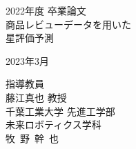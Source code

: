 \documentclass{jsarticle}
\begin{document}
  \begin{titlepage}
    \begin{center}
      \vspace*{1cm}
      \LARGE 2022年度 卒業論文 \\
      \vspace*{1cm}
      \Huge 商品レビューデータを用いた \\
      星評価予測 \\
      \vspace*{45mm}

      {\LARGE %
      2023年3月}
      \vspace*{10mm}
      
      {\Large
      指導教員 \\
      藤江真也 教授} \\
      \vspace*{20mm}
      \LARGE
      千葉工業大学 先進工学部 \\
      未来ロボティクス学科 \\
      \vspace*{10mm}
      {\Huge 牧~野~幹~也}
    \end{center}
  \end{titlepage}

  \frontmatter
  \baselineskip=21pt
  \tableofcontents
  \listoffigures
  \listoftables

  \setlength{\abovedisplayskip}{25pt plus0pt minus0pt}
  \setlength{\belowdisplayskip}{25pt plus0pt minus0pt}

  \mainmatter
  

  

  

  

  

  

  \backmatter
  

  

  \mainmatter
  \addtocounter{page}{2}
  \appendix
  
\end{document}
